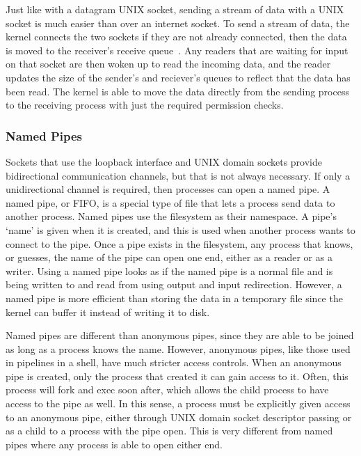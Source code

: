 Just like with a datagram UNIX socket, sending a stream of data with a UNIX socket is much easier than over an internet socket.  To send a stream of data, the kernel connects the two sockets if they are not already connected, then the data is moved to the receiver's receive queue~\cite[265--268]{Stevens:1996:TIT:233130}.  Any readers that are waiting for input on that socket are then woken up to read the incoming data, and the reader updates the size of the sender's and reciever's queues to reflect that the data has been read.  The kernel is able to move the data directly from the sending process to the receiving process with just the required permission checks.

\subsubsection{Named Pipes}
Sockets that use the loopback interface and UNIX domain sockets provide bidirectional communication channels, but that is not always necessary.  If only a unidirectional channel is required, then processes can open a named pipe.  A named pipe, or FIFO, is a special type of file that lets a process send data to another process.  Named pipes use the filesystem as their namespace.  A pipe's `name' is given when it is created, and this is used when another process wants to connect to the pipe.  Once a pipe exists in the filesystem, any process that knows, or guesses, the name of the pipe can open one end, either as a reader or as a writer.  Using a named pipe looks as if the named pipe is a normal file and is being written to and read from using output and input redirection.  However, a named pipe is more efficient than storing the data in a temporary file since the kernel can buffer it instead of writing it to disk.

Named pipes are different than anonymous pipes, since they are able to be joined as long as a process knows the name.  However, anonymous pipes, like those used in pipelines in a shell, have much stricter access controls.  When an anonymous pipe is created, only the process that created it can gain access to it.  Often, this process will fork and exec soon after, which allows the child process to have access to the pipe as well.  In this sense, a process must be explicitly given access to an anonymous pipe, either through UNIX domain socket descriptor passing or as a child to a process with the pipe open.  This is very different from named pipes where any process is able to open either end.

